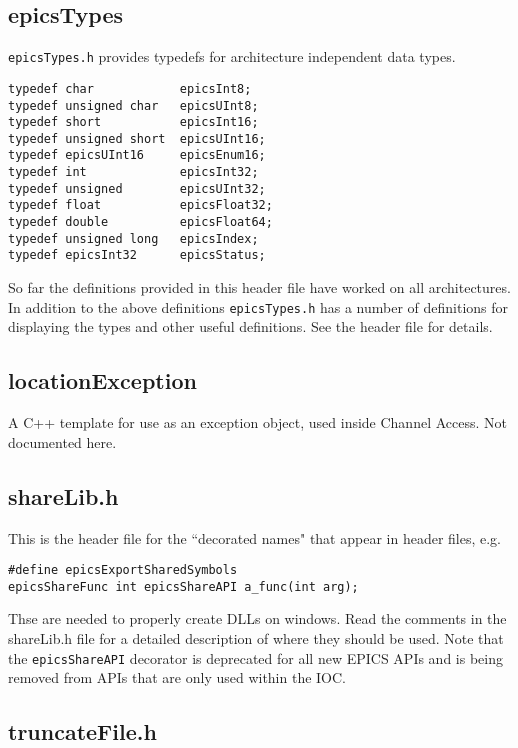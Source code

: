 \subsection{epicsTypes}

\verb|epicsTypes.h| provides typedefs for architecture independent data types.

\begin{verbatim}
typedef char            epicsInt8;
typedef unsigned char   epicsUInt8;
typedef short           epicsInt16;
typedef unsigned short  epicsUInt16;
typedef epicsUInt16     epicsEnum16;
typedef int             epicsInt32;
typedef unsigned        epicsUInt32;
typedef float           epicsFloat32;
typedef double          epicsFloat64;
typedef unsigned long   epicsIndex;
typedef epicsInt32      epicsStatus;
\end{verbatim}

So far the definitions provided in this header file have worked on all architectures.
In addition to the above definitions \verb|epicsTypes.h| has a number of definitions for displaying the types and other useful definitions.
See the header file for details.

\subsection{locationException}

A C++ template for use as an exception object, used inside Channel Access.
Not documented here.

\subsection{shareLib.h}

This is the header file for the ``decorated names" that appear in header files, e.g.

\begin{verbatim}
#define epicsExportSharedSymbols
epicsShareFunc int epicsShareAPI a_func(int arg);
\end{verbatim}

Thse are needed to properly create DLLs on windows.
Read the comments in the shareLib.h file for a detailed description of where they should be used.
Note that the \verb|epicsShareAPI| decorator is deprecated for all new EPICS APIs and is being removed from APIs that are only used within the IOC.

\subsection{truncateFile.h}

